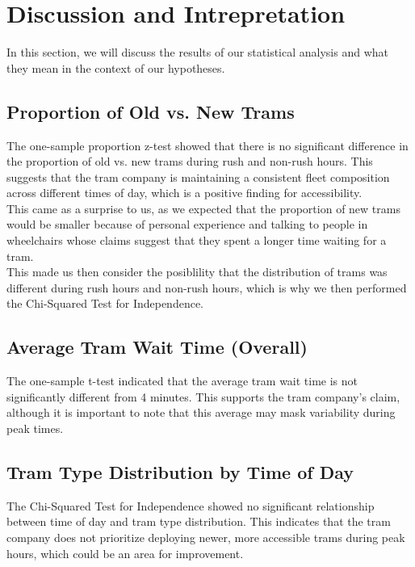 \documentclass[a4paper, 10pt]{article}
\begin{document}
	\section{Discussion and Intrepretation}
		\noindent In this section, we will discuss the results of our statistical analysis and what they mean in the context of our hypotheses. \\

		\subsection{Proportion of Old vs. New Trams}
			\noindent The one-sample proportion z-test showed that there is no significant difference in the proportion of old vs. 
			new trams during rush and non-rush hours. 
			This suggests that the tram company is maintaining a consistent fleet composition across different times of day,
			which is a positive finding for accessibility. \\

			\noindent This came as a surprise to us, as we expected that the proportion of new trams would be smaller
			because of personal experience and talking to people in wheelchairs whose claims suggest that they spent a 
			longer time waiting for a tram. \\

			\noindent This made us then consider the posiblility that the distribution of trams was different during 
			rush hours and non-rush hours, which is why we then performed the Chi-Squared Test for Independence.

		\subsection{Average Tram Wait Time (Overall)}
			\noindent The one-sample t-test indicated that the average tram wait time is not significantly different from 4 minutes. 
			This supports the tram company's claim, although it is important to note that this average may mask variability during peak times. \\

		\subsection{Tram Type Distribution by Time of Day}
			\noindent The Chi-Squared Test for Independence showed no significant relationship between time of day and tram type distribution. 
			This indicates that the tram company does not prioritize deploying newer, more accessible trams during peak hours, which could be an area for improvement.
\end{document}
